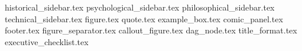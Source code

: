 {historical_sidebar.tex}
{psychological_sidebar.tex}
{philosophical_sidebar.tex}
{technical_sidebar.tex}
{figure.tex}
{quote.tex}
{example_box.tex}
{comic_panel.tex}
{footer.tex}
{figure_separator.tex}
{callout_figure.tex}
{dag_node.tex}
{title_format.tex}
{executive_checklist.tex}

